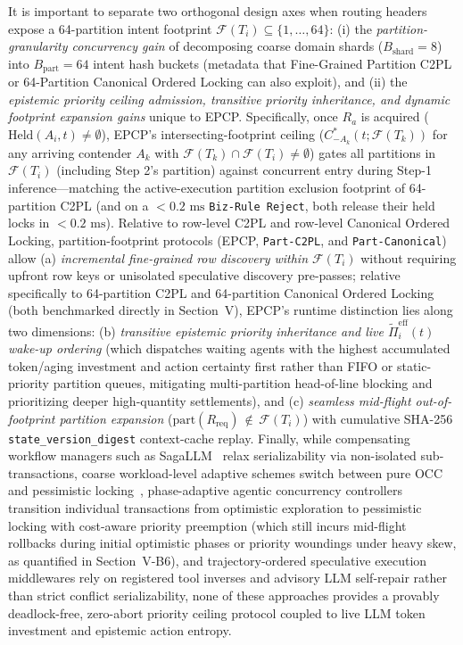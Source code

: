 \documentclass[conference,10pt]{IEEEtran}
\begin{document}
It is important to separate two orthogonal design axes when routing headers expose a 64-partition intent footprint $\mathcal{F}(T_i) \subseteq \{1, \dots, 64\}$: (i) the \textit{partition-granularity concurrency gain} of decomposing coarse domain shards ($B_{\text{shard}}=8$) into $B_{\text{part}}=64$ intent hash buckets (metadata that Fine-Grained Partition C2PL or 64-Partition Canonical Ordered Locking can also exploit), and (ii) the \textit{epistemic priority ceiling admission, transitive priority inheritance, and dynamic footprint expansion gains} unique to EPCP. Specifically, once $R_a$ is acquired ($\text{Held}(A_i, t) \ne \emptyset$), EPCP's intersecting-footprint ceiling ($C_{-A_k}^*(t; \mathcal{F}(T_k))$ for any arriving contender $A_k$ with $\mathcal{F}(T_k) \cap \mathcal{F}(T_i) \ne \emptyset$) gates all partitions in $\mathcal{F}(T_i)$ (including Step 2's partition) against concurrent entry during Step-1 inference---matching the active-execution partition exclusion footprint of 64-partition C2PL (and on a $<0.2\text{ ms}$ \texttt{Biz-Rule Reject}, both release their held locks in $<0.2\text{ ms}$). Relative to row-level C2PL and row-level Canonical Ordered Locking, partition-footprint protocols (EPCP, \texttt{Part-C2PL}, and \texttt{Part-Canonical}) allow (a) \textit{incremental fine-grained row discovery within $\mathcal{F}(T_i)$} without requiring upfront row keys or unisolated speculative discovery pre-passes; relative specifically to 64-partition C2PL and 64-partition Canonical Ordered Locking (both benchmarked directly in Section~V), EPCP's runtime distinction lies along two dimensions: (b) \textit{transitive epistemic priority inheritance and live $\tilde{\Pi}_i^{\text{eff}}(t)$ wake-up ordering} (which dispatches waiting agents with the highest accumulated token/aging investment and action certainty first rather than FIFO or static-priority partition queues, mitigating multi-partition head-of-line blocking and prioritizing deeper high-quantity settlements), and (c) \textit{seamless mid-flight out-of-footprint partition expansion} ($\text{part}(R_{\text{req}}) \,\notin\, \mathcal{F}(T_i)$) with cumulative SHA-256 \texttt{state\_version\_digest} context-cache replay. Finally, while compensating workflow managers such as SagaLLM~\cite{chang2025sagallm} relax serializability via non-isolated sub-transactions, coarse workload-level adaptive schemes switch between pure OCC~\cite{kung1981optimistic} and pessimistic locking~\cite{harding2017evaluation}, phase-adaptive agentic concurrency controllers transition individual transactions from optimistic exploration to pessimistic locking with cost-aware priority preemption (which still incurs mid-flight rollbacks during initial optimistic phases or priority woundings under heavy skew, as quantified in Section~V-B6), and trajectory-ordered speculative execution middlewares rely on registered tool inverses and advisory LLM self-repair rather than strict conflict serializability, none of these approaches provides a provably deadlock-free, zero-abort priority ceiling protocol coupled to live LLM token investment and epistemic action entropy.
\end{document}
